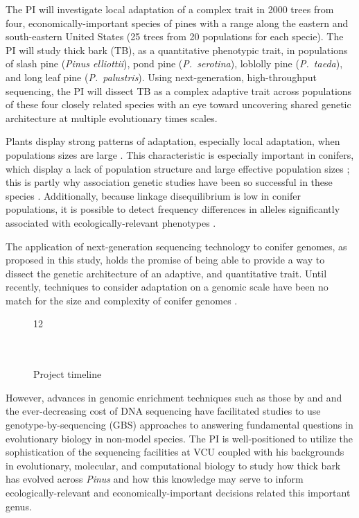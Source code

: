 The PI will investigate local adaptation of a complex trait in 2000 trees from four, economically-important species of pines with a range along 
the eastern and south-eastern United States (25 trees from 20 populations for each specie).  The PI will study 
thick bark (TB), as a quantitative phenotypic trait, in populations of slash pine (\emph{Pinus elliottii}), pond pine (\emph{P.\ serotina}), 
loblolly pine (\emph{P.\ taeda}), and long leaf pine (\emph{P.\ palustris}).  Using next-generation, high-throughput sequencing, the PI 
will dissect TB as a complex adaptive trait across populations of these four closely related species 
with an eye toward uncovering shared genetic architecture at multiple evolutionary times scales.  

Plants display strong patterns of adaptation, especially local adaptation, when populations sizes are large \citep{Leimu:2008fb}.
This characteristic is especially important in conifers, which display a lack of population structure and large effective population 
sizes \citep{Neale:2004hi}; this is partly why association genetic studies have been so successful in these species 
\citep{Eckert:2012cw,Eckert:2010hd, Wegrzyn:2010dd,Eckert:2009hh,GonzalezMartinez:2007gy,GonzalezMartinez:2006ij,Gupta:2005fx}.  
Additionally, because linkage disequilibrium is low in conifer populations, it is possible to detect frequency differences in alleles significantly 
associated with ecologically-relevant phenotypes \citep{Neale:2004hi}. 

The application of next-generation sequencing technology to conifer genomes, as proposed in this study, holds the promise of 
being able to provide a way to dissect the genetic architecture of an adaptive, and quantitative trait.  Until recently, techniques 
to consider adaptation on a genomic scale have been no match for the size and complexity of conifer genomes \citep{Mackay:2012hr}.  
\begin{figure}
	\begin{ganttchart}[vgrid,
	bar/.style={fill=gray!40}, 
	title/.style={fill=gray!10}]{12}
	\\
	\\
	\\
	\end{ganttchart}
\caption{Project timeline}
\vspace{-10pt}
\label{f:timeline}
\end{figure}
However, advances in genomic enrichment techniques such as those by \citet{Parchman:2012ca} and \citet{Willing:2011jb} and 
the ever-decreasing cost of DNA sequencing have facilitated studies to use genotype-by-sequencing (GBS) approaches to 
answering fundamental questions in evolutionary biology in non-model species.  The PI is well-positioned to utilize the 
sophistication of the sequencing facilities at VCU coupled with his backgrounds in evolutionary, molecular, and 
computational biology to study how thick bark has evolved across \emph{Pinus} and how this knowledge may serve to 
inform ecologically-relevant and economically-important decisions related this important genus.

